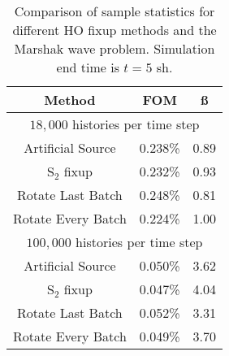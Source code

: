 \begin{table}
    \centering
    \begin{tabular}{c|cc|} \hline
    Method & FOM  & \ss  \\ \hline
    \multicolumn{3}{|c|}{$18,000$ histories per time step} \\ \hline
    Artificial Source  &  0.238\%  & 0.89 \\
    S$_2$ fixup        &  0.232\%  & 0.93  \\
    Rotate Last Batch  &  0.248\%  & 0.81   \\
    Rotate Every Batch &  0.224\%  & 1.00    \\ \hline
    \multicolumn{3}{|c|}{$100,000$ histories per time step} \\ \hline
Artificial Source      &  0.050\%  & 3.62 \\
S$_2$ fixup            &  0.047\%  & 4.04 \\
Rotate Last Batch      &  0.052\%  & 3.31 \\
Rotate Every Batch     &  0.049\%  & 3.70  \\ \hline
    \end{tabular}
    \caption{\label{tab:marsh_fix}Comparison of sample statistics for different HO fixup
methods and the Marshak wave problem. Simulation end time is $t=5$ sh.}
\end{table}




